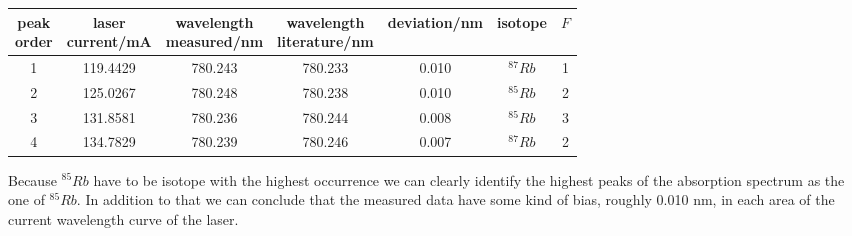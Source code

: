 \begin{center}
    \begin{tabular}{c | c | c c c | c c }
        \makecell{peak\\order} & \makecell{laser\\current/mA} & \makecell{wavelength\\measured/nm} & \makecell{wavelength\\literature/nm} & deviation/nm & isotope & $F$ \\
        \hline
        1 & 119.4429 & 780.243 & 780.233 & 0.010 & $^{87}Rb$ & 1 \\
        2 & 125.0267 & 780.248 & 780.238 & 0.010 & $^{85}Rb$ & 2 \\
        3 & 131.8581 & 780.236 & 780.244 & 0.008 & $^{85}Rb$ & 3 \\
        4 & 134.7829 & 780.239 & 780.246 & 0.007 & $^{87}Rb$ & 2 \\       
    \end{tabular}
    \label{tab:identify}
\end{center}
Because $^{85}Rb$ have to be isotope with the highest occurrence we can clearly identify the highest peaks of the absorption spectrum as the one of $^{85}Rb$. In addition to that we can conclude that the measured data have some kind of bias, roughly 0.010 nm, in each area of the current wavelength curve of the laser.